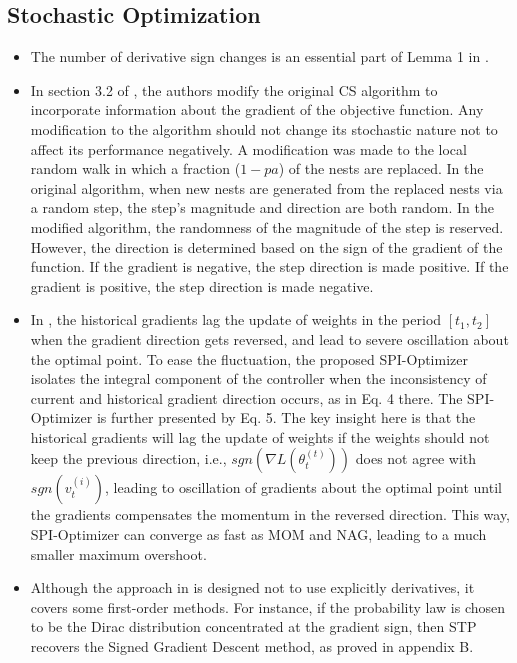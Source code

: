 \documentclass[11pt]{book}
\begin{document}
\subsection{Stochastic Optimization}
\begin{itemize}
\item The number of derivative sign changes is an essential part of Lemma
1 in \cite{popescu2007robust}.
\item In section 3.2 of \cite{fateen2014note},
the authors modify the original CS algorithm to incorporate information
about the gradient of the objective function. Any modification to
the algorithm should not change its stochastic nature not to affect
its performance negatively. A modification was made to the local random
walk in which a fraction ($1-pa$) of the nests are replaced. In the
original algorithm, when new nests are generated from the replaced
nests via a random step, the step's magnitude and direction are both
random. In the modified algorithm, the randomness of the magnitude
of the step is reserved. However, the direction is determined based
on the sign of the gradient of the function. If the gradient is negative,
the step direction is made positive. If the gradient is positive,
the step direction is made negative.
\item In \cite{wang2019spi},
the historical gradients lag the update of weights in the period $\left[t_{1},t_{2}\right]$
when the gradient direction gets reversed, and lead to severe oscillation
about the optimal point. To ease the fluctuation, the proposed SPI-Optimizer
isolates the integral component of the controller when the inconsistency
of current and historical gradient direction occurs, as in Eq. 4 there.
The SPI-Optimizer is further presented by Eq. 5. The key insight here
is that the historical gradients will lag the update of weights if
the weights should not keep the previous direction, i.e., $sgn\left(\nabla L\left(\theta_{t}^{\left(t\right)}\right)\right)$
does not agree with $sgn\left(v_{t}^{\left(i\right)}\right)$, leading
to oscillation of gradients about the optimal point until the gradients
compensates the momentum in the reversed direction. This way, SPI-Optimizer
can converge as fast as MOM and NAG, leading to a much smaller maximum
overshoot.
\item Although the approach in \cite{bergou2020stochastic}
is designed not to use explicitly derivatives, it covers some first-order
methods. For instance, if the probability law is chosen to be the
Dirac distribution concentrated at the gradient sign, then STP recovers
the Signed Gradient Descent method, as proved in appendix B.
\end{itemize}
\end{document}
